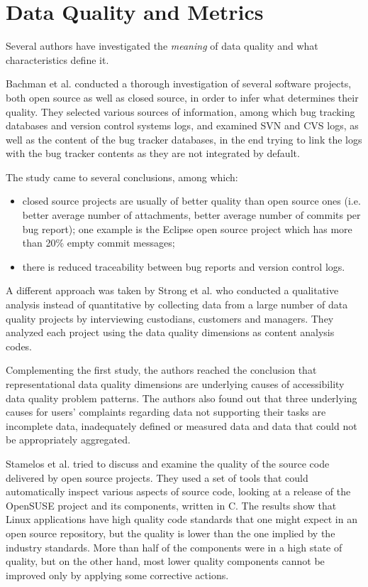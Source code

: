 \documentclass[11pt,english,twocolumn]{article}
\begin{document}
\section{Data Quality and Metrics}
\label{sec:data-quality}

Several authors have investigated the \emph{meaning} of data quality and
what characteristics define it.

Bachman et al.\cite{bachmann2009software} conducted a thorough investigation of several
software projects, both open source as well as closed source, in order 
to infer what determines their quality. They selected 
various sources of information, among which bug tracking 
databases and version control systems logs, and examined SVN and CVS logs,
as well as the content of the bug tracker databases, in the end trying to link 
the logs with the bug tracker contents as they are not integrated by default. 

The study came to several conclusions, among which:
  \begin{itemize}
    \item closed source projects are usually of better quality than open source ones
    (i.e. better average number of attachments, better average number of commits per bug report); 
    one example is the Eclipse open source project which has more than 20\% empty commit messages;
    \item there is reduced traceability between bug reports and version control logs.
  \end{itemize}

A different approach was taken by Strong et al.\cite{strong1997data} who conducted a qualitative analysis
instead of quantitative by collecting data from a large number of data quality projects by 
interviewing custodians, customers and managers. They analyzed each project
using the data quality dimensions as content analysis codes.

Complementing the first study, the authors reached the conclusion that representational data 
quality dimensions are underlying causes of accessibility data quality problem
patterns. The authors also found out that three underlying causes for users'
complaints regarding data not supporting their tasks are incomplete data, 
inadequately defined or measured data and data that could not be appropriately
aggregated.

Stamelos et al. \cite{stamelos2002code} tried to discuss and examine the quality
of the source code delivered by open source projects. They used a set of tools
that could automatically inspect various aspects of source code, looking at
a release of the OpenSUSE project and its components, written in C.
The results show that Linux applications have high quality 
code standards that one might expect in an open source repository, but 
the quality is lower than the one implied by the industry standards. More than half
of the components were in a high state of quality, but on the other hand, 
most lower quality components cannot be improved only by applying some
corrective actions. 
\end{document}
